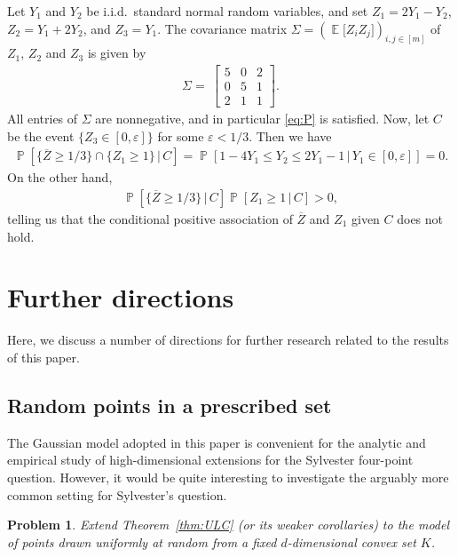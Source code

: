 \documentclass[12pt,english,reqno]{amsart}
\theoremstyle{plain}
\newtheorem{prob}[thm]{Problem}
\theoremstyle{remark}
\numberwithin{figure}{section}
\numberwithin{equation}{section}
\def\bZ{\overline{Z}}
\DeclareMathOperator{\Eb}{\mathbb{E}} %
\DeclareMathOperator{\Pb}{\mathbb{P}} %
\newcommand{\com}[2]{\textcolor{blue}{\texttt{#1 comment: #2}}}
\begin{document}
Let $Y_1$ and $Y_2$ be i.i.d.\ standard normal random variables, and set $Z_1= 2Y_1-Y_2$, $Z_2 = Y_1+2Y_2$, and $Z_3=Y_1$.
The covariance matrix $\Sigma=(\Eb\big[Z_i Z_j\big])_{i,j \in [m]}$ of $Z_1$, $Z_2$ and $Z_3$ is given by
\begin{align*}
	\Sigma = \
	\begin{bmatrix}
		5 & 0 & 2 \\
		0 & 5 & 1 \\
		2 & 1 & 1
	\end{bmatrix}.
\end{align*}
All entries of $\Sigma$ are nonnegative, and in particular \ref{eq:P} is satisfied. Now, let $C$ be the event $\{ Z_3 \in [0, \varepsilon] \}$ for some $\varepsilon <{1}/{3}$. Then we have
\begin{align*}
	\Pb\left[ \{\bZ\geq {1}/{3}\} \cap \{Z_1 \geq 1\} \,\vert\, C \right] = \Pb\left[ 1-4Y_1 \leq Y_2 \leq 2Y_1-1 \,\vert\, Y_1 \in [0,\varepsilon] \right] = 0.
\end{align*}
On the other hand,
\begin{align*}
	\Pb\left[ \{\bZ\geq {1}/{3}\} \,\vert\, C \right] \Pb\left[ Z_1\geq 1 \,\vert\, C \right] > 0,
\end{align*}
telling us that the conditional positive association of $\bZ$ and $Z_1$ given $C$ does not hold.

\section {Further directions}\label {sec:sto-conv}

Here, we discuss a number of directions for further research related to the results of this paper.

\subsection*{Random points in a prescribed set} The Gaussian model adopted in this paper is convenient for the analytic and empirical study of high-dimensional extensions for the Sylvester four-point question. However, it would be quite interesting to investigate the arguably more common setting for Sylvester's question.

\begin{prob}\label{prob:model-K} Extend Theorem~\ref {thm:ULC} (or its weaker corollaries) to the model of points drawn uniformly at random from a fixed $d$-dimensional convex set $K$.
\end {prob}
\end{document}
